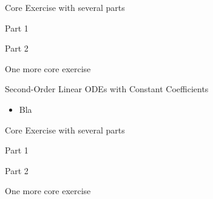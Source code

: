 \newpage

\question
	Core Exercise with several parts
\begin{parts}
	\item Part 1
	\item Part 2
\end{parts}

\bookonlynewpage


\question
	One more core exercise









%
%



\begin{module}{Second-Order Linear ODEs with Constant Coefficients}
	\label{2nd:solving}

	
	
\end{module}



\begin{lesson}

	\begin{itemize}
		\item Bla
	\end{itemize}
	

\end{lesson}




\newpage

\question
	Core Exercise with several parts
\begin{parts}
	\item Part 1
	\item Part 2
\end{parts}

\bookonlynewpage


\question
	One more core exercise



